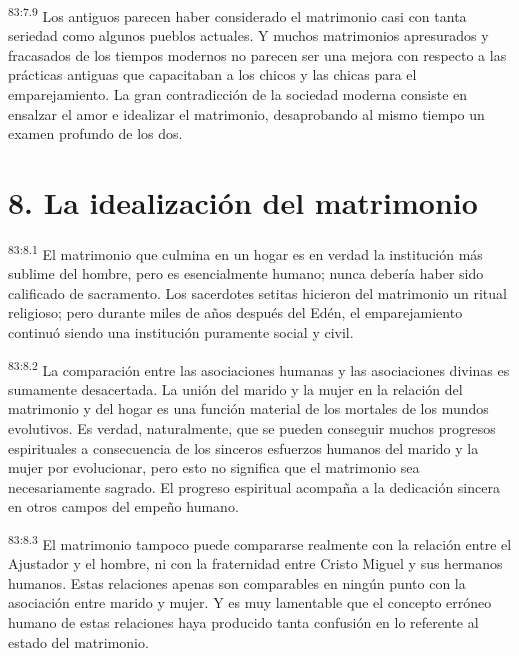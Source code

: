\documentclass[twoside, 11pt]{book}
\begin{document}
\par
\textsuperscript{83:7.9} Los antiguos parecen haber considerado el matrimonio casi con tanta seriedad como algunos pueblos actuales. Y muchos matrimonios apresurados y fracasados de los tiempos modernos no parecen ser una mejora con respecto a las prácticas antiguas que capacitaban a los chicos y las chicas para el emparejamiento. La gran contradicción de la sociedad moderna consiste en ensalzar el amor e idealizar el matrimonio, desaprobando al mismo tiempo un examen profundo de los dos.

\section*{8. La idealización del matrimonio}
\par
\textsuperscript{83:8.1} El matrimonio que culmina en un hogar es en verdad la institución más sublime del hombre, pero es esencialmente humano; nunca debería haber sido calificado de sacramento. Los sacerdotes setitas hicieron del matrimonio un ritual religioso; pero durante miles de años después del Edén, el emparejamiento continuó siendo una institución puramente social y civil.

\par
\textsuperscript{83:8.2} La comparación entre las asociaciones humanas y las asociaciones divinas es sumamente desacertada. La unión del marido y la mujer en la relación del matrimonio y del hogar es una función material de los mortales de los mundos evolutivos. Es verdad, naturalmente, que se pueden conseguir muchos progresos espirituales a consecuencia de los sinceros esfuerzos humanos del marido y la mujer por evolucionar, pero esto no significa que el matrimonio sea necesariamente sagrado. El progreso espiritual acompaña a la dedicación sincera en otros campos del empeño humano.

\par
\textsuperscript{83:8.3} El matrimonio tampoco puede compararse realmente con la relación entre el Ajustador y el hombre, ni con la fraternidad entre Cristo Miguel y sus hermanos humanos. Estas relaciones apenas son comparables en ningún punto con la asociación entre marido y mujer. Y es muy lamentable que el concepto erróneo humano de estas relaciones haya producido tanta confusión en lo referente al estado del matrimonio.
\end{document}
